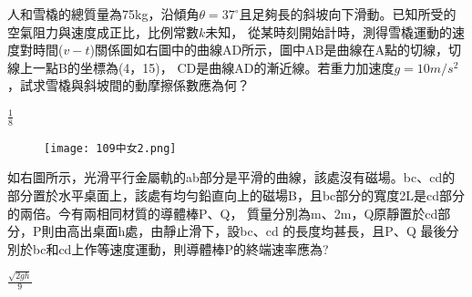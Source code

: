 \documentclass[cn,10pt,math=newtx,chinesefont=founder,device=ig]{elegantbook}
\begin{document}
\begin{example}
  人和雪橇的總質量為75kg，沿傾角$\theta=37^\circ $且足夠長的斜坡向下滑動。已知所受的空氣阻力與速度成正比，比例常數$k$未知，
  從某時刻開始計時，測得雪橇運動的速度對時間($v-t$)關係圖如右圖中的曲線AD所示，圖中AB是曲線在A點的切線，切線上一點B的坐標為(4，15)，
  CD是曲線AD的漸近線。若重力加速度$g=10m/s^2$，試求雪橇與斜坡間的動摩擦係數應為何？\\
  \rightline{[台中女中教甄109]}
\end{example}
\begin{solution}
  $\frac{1}{8}$
\end{solution}
\begin{figure}[htbp]
  \flushright
  \texttt{[image: 109中女2.png]}
\end{figure}
\newpage
\begin{example}
  如右圖所示，光滑平行金屬軌的ab部分是平滑的曲線，該處沒有磁場。bc、cd的部分置於水平桌面上，該處有均勻鉛直向上的磁場B，且bc部分的寬度2L是cd部分的兩倍。今有兩相同材質的導體棒P、Q，
  質量分別為m、2m，Q原靜置於cd部分，P則由高出桌面h處，由靜止滑下，設bc、cd 的長度均甚長，且P、Q 最後分別於bc和cd上作等速度運動，則導體棒P的終端速率應為?\\
  \rightline{[台中女中教甄109]}
\end{example}

\begin{solution}
  $\frac{\sqrt{2gh}}{9}$
\end{solution}
\end{document}
